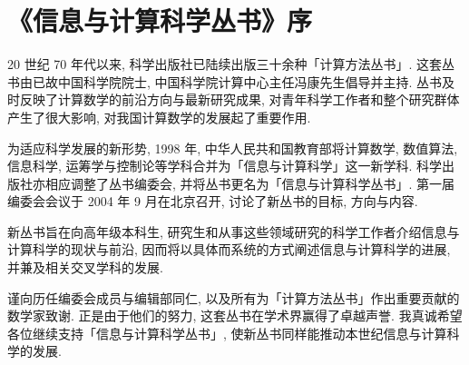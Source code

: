 \cleardoublepage
{}
\chapter*{《信息与计算科学丛书》序}

20 世纪 70 年代以来, 科学出版社已陆续出版三十余种「计算方法丛书」. 这套丛书由已故中国科学院院士, 中国科学院计算中心主任冯康先生倡导并主持. 丛书及时反映了计算数学的前沿方向与最新研究成果, 对青年科学工作者和整个研究群体产生了很大影响, 对我国计算数学的发展起了重要作用.

为适应科学发展的新形势, 1998 年, 中华人民共和国教育部将计算数学, 数值算法, 信息科学, 运筹学与控制论等学科合并为「信息与计算科学」这一新学科. 科学出版社亦相应调整了丛书编委会, 并将丛书更名为「信息与计算科学丛书」. 第一届编委会会议于 2004 年 9 月在北京召开, 讨论了新丛书的目标, 方向与内容.

新丛书旨在向高年级本科生, 研究生和从事这些领域研究的科学工作者介绍信息与计算科学的现状与前沿, 因而将以具体而系统的方式阐述信息与计算科学的进展, 并兼及相关交叉学科的发展.

谨向历任编委会成员与编辑部同仁, 以及所有为「计算方法丛书」作出重要贡献的数学家致谢. 正是由于他们的努力, 这套丛书在学术界赢得了卓越声誉. 我真诚希望各位继续支持「信息与计算科学丛书」, 使新丛书同样能推动本世纪信息与计算科学的发展.

\vspace{1.5em}
